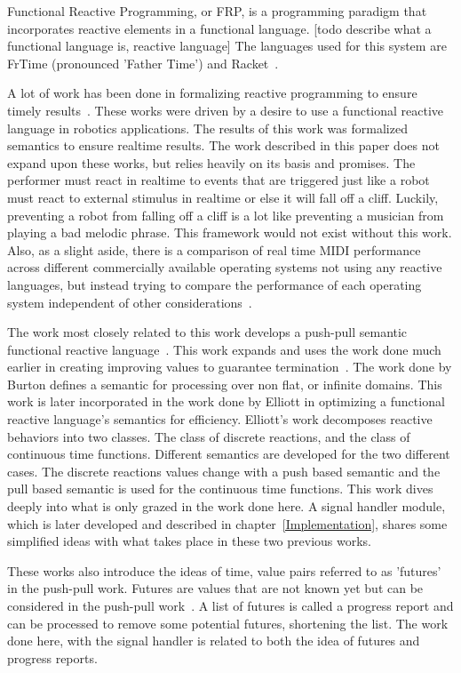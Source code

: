 \documentclass[12pt]{ucthesis}
\begin{document}
{Functional Reactive Programming, or FRP, is a programming paradigm that incorporates reactive elements in a functional language. [todo describe what a functional language is, reactive language] The languages used for this system are FrTime (pronounced 'Father Time') and Racket~\cite{FrTime}.

A lot of work has been done in formalizing reactive programming to ensure timely results~\cite{EventDriven}\cite{RealTime}. These works were driven by a desire to use a functional reactive language in robotics applications. The results of this work was formalized semantics to ensure realtime results. The work described in this paper does not expand upon these works, but relies heavily on its basis and promises. The performer must react in realtime to events that are triggered just like a robot must react to external stimulus in realtime or else it will fall off a cliff. Luckily, preventing a robot from falling off a cliff is a lot like preventing a musician from playing a bad melodic phrase. This framework would not exist without this work. Also, as a slight aside, there is a comparison of real time MIDI performance across different commercially available operating systems not using any reactive languages, but instead trying to compare the performance of each operating system independent of other considerations~\cite{real-time-midi}.

The work most closely related to this work develops a push-pull semantic functional reactive language~\cite{push-pull-frp}. This work expands and uses the work done much earlier in creating improving values to guarantee termination~\cite{historic-paper}. The work done by Burton defines a semantic for processing over non flat, or infinite domains. This work is later incorporated in the work done by Elliott in optimizing a functional reactive language's semantics for efficiency. Elliott's work decomposes reactive behaviors into two classes. The class of discrete reactions, and the class of continuous time functions. Different semantics are developed for the two different cases. The discrete reactions values change with a push based semantic and the pull based semantic is used for the continuous time functions. This work dives deeply into what is only grazed in the work done here. A signal handler module, which is later developed and described in chapter~\ref{Implementation}, shares some simplified ideas with what takes place in these two previous works. 

These works also introduce the ideas of time, value pairs referred to as 'futures' in the push-pull work. Futures are values that are not known yet but can be considered in the push-pull work~\cite{push-pull-frp}. A list of futures is called a progress report and can be processed to remove some potential futures, shortening the list. The work done here, with the signal handler is related to both the idea of futures and progress reports. 

}
\end{document}
